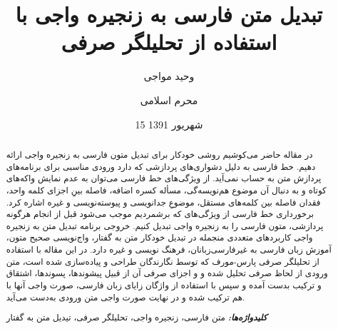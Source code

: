 \documentclass[12pt,onecolumn,a4paper]{article}
\providecommand{\keywords}[1]{\textbf{\textit{کلیدواژه‌ها:}} #1}
\begin{document}
    \title{تبدیل متن فارسی به زنجیره واجی با استفاده از تحلیلگر صرفی}
    \author[1]{وحید مواجی}
    \author[2]{محرم اسلامی}
    \date{15 شهریور 1391}
    \maketitle

    \begin{abstract}
        در مقاله حاضر می‌کوشیم روشی خودکار برای تبدیل متون فارسی به زنجیره واجی ارائه دهیم. خط فارسی به دلیل دشواری‌های پردازشی که دارد ورودی مناسبی برای برنامه‌های پردازش متن به حساب نمی‌آید. از ویژگی‌های خط فارسی می‌توان به عدم نمایش واکه‌های کوتاه و به دنبال آن موضوع هم‌نویسه‌گی، مسأله کسره اضافه، فاصله بینِ اجزای کلمه واحد، فقدان فاصله بین کلمه‌های مستقل، موضوعِ جدانویسی و پیوسته‌نویسی و غیره اشاره کرد. برخورداری خط فارسی از ویژگی‌های که برشمردیم موجب می‌شود قبل از انجام هرگونه پردازشی، متون فارسی را به زنجیره واجی تبدیل کنیم. خروجی برنامه تبدیل متن به زنجیره واجی کاربردهای متعددی منجمله در تبدیل خودکار متن به گفتار، واج‌نویسی صحیح متون، آموزش زبان فارسی به غیرفارسی‌زبانان، فرهنگ نویسی و غیره دارد. در این مقاله با استفاده از تحلیلگر صرفی پارس-مورف که توسط نگارندگان طراحی و پیاده‌سازی شده است، متن ورودی از لحاظ صرفی تحلیل شده و و اجزای صرفی آن از قبیل پیشوندها، پسوندها، اشتقاق و ترکیب بدست آمده و سپس با استفاده از واژگان زایای زبان فارسی، صورت واجی‌ آنها با هم ترکیب شده و در نهایت صورت واجی متن ورودی به‌دست می‌آید.
        \par
        \keywords{متن فارسی، زنجیره واجی، تحلیلگر صرفی، تیدیل متن به گفتار}
    \end{abstract}
\end{document}
